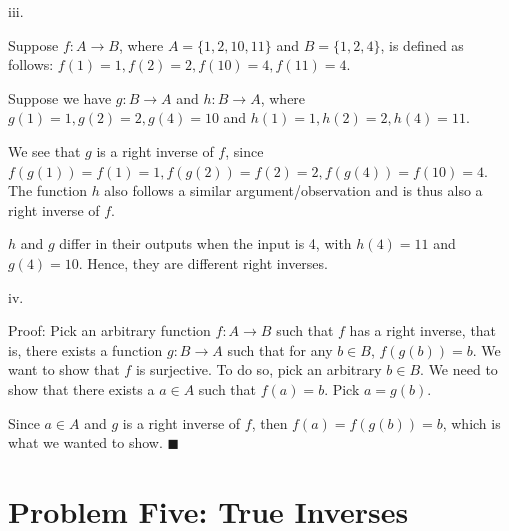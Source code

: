 \documentclass{article}
\renewcommand{\(}{\left(}
\renewcommand{\)}{\right)}
\theoremstyle{plain}
\theoremstyle{plain}
\theoremstyle{definition}
\begin{document}
    iii.
    \begin{shaded}
        Suppose $f:A\to B$, where $A=\{1,2,10,11\}$ and $B=\{1,2,4\}$, is defined as follows: $f(1)=1,f(2)=2,f(10)=4,f(11)=4$.

        \vspace{4mm}

        Suppose we have $g:B\to A$ and $h:B\to A$, where $g(1)=1,g(2)=2,g(4)=10$ and $h(1)=1,h(2)=2,h(4)=11$.

        \vspace{4mm}

        We see that $g$ is a right inverse of $f$, since $f(g(1))=f(1)=1,f(g(2))=f(2)=2,f(g(4))=f(10)=4$. The function $h$ also follows a similar argument/observation and is thus also a right inverse of $f$.

        \vspace{4mm}

        $h$ and $g$ differ in their outputs when the input is 4, with $h(4)=11$ and $g(4)=10$. Hence, they are different right inverses.
    \end{shaded}
    
    iv.
    \begin{shaded}
        Proof: Pick an arbitrary function $f:A\to B$ such that $f$ has a right inverse, that is, there exists a function $g:B\to A$ such that for any $b\in B$, $f(g(b))=b$. We want to show that $f$ is surjective. To do so, pick an arbitrary $b\in B$. We need to show that there exists a $a\in A$ such that $f(a)=b$. Pick $a=g(b)$.

        \vspace{4mm}

        Since $a\in A$ and $g$ is a right inverse of $f$, then $f(a)=f(g(b))=b$, which is what we wanted to show. $\blacksquare$


    \end{shaded}
    
\newpage

\section*{Problem Five: True Inverses}
\end{document}
